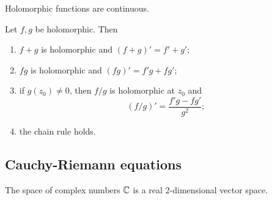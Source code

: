 \begin{lemma}
Holomorphic functions are continuous.
\end{lemma}
\begin{lemma}
Let $f,g$ be holomorphic. Then
\begin{enumerate}
\item $f+g$ is holomorphic and $(f+g)' = f'+g'$;
\item $fg$ is holomorphic and $(fg)' = f'g+fg'$;
\item if $g(z_0)\neq 0$, then $f/g$ is holomorphic at $z_0$ and
\[ (f/g)' = \frac{f'g - fg'}{g^2}; \]
\item the chain rule holds.
\end{enumerate}
\end{lemma}

\subsection{Cauchy-Riemann equations}
The space of complex numbers $\mathbb{C}$ is a real $2$-dimensional vector space.

